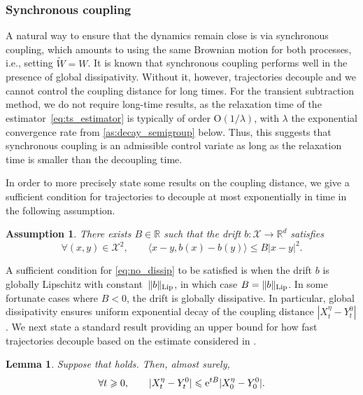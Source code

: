 \documentclass[11pt]{article}
\newcommand{\R}{\mathbb{R}}
\newcommand{\e}{\mathrm{e}}
\newcommand{\bigO}{\mathrm{O}}
\renewcommand{\geq}{\geqslant}
\renewcommand{\leq}{\leqslant}
\newtheorem{assumption}{Assumption}
\newtheorem{lemma}{Lemma}
\theoremstyle{definition}
\newcommand{\bLip}{\|b\|_{\rm Lip}}
\begin{document}
\subsubsection{Synchronous coupling}
\label{subsubsec:synchronous_coup}
A natural way to ensure that the dynamics remain close is via synchronous coupling, which amounts to using the same Brownian motion for both processes, i.e., setting $\widetilde{W} = W$. It is known that synchronous coupling performs well in the presence of global dissipativity. Without it, however, trajectories decouple and we cannot control the coupling distance for long times. For the transient subtraction method, we do not require long-time results, as the relaxation time of the estimator~\eqref{eq:ts_estimator} is typically of order $\bigO(1/\lambda)$, with $\lambda$ the exponential convergence rate from \cref{as:decay_semigroup} below. Thus, this suggests that synchronous coupling is an admissible control variate as long as the relaxation time is smaller than the decoupling time.

In order to more precisely state some results on the coupling distance, we give a sufficient condition for trajectories to decouple at most exponentially in time in the following assumption.

\begin{assumption}
\label{as:contractivity}
	There exists $B\in\R$ such that the drift $b\colon \mathcal{X} \to \R^d$ satisfies
\begin{equation}
		\forall (x,y) \in \mathcal{X}^2, \qquad \langle x-y, b(x)-b(y)\rangle \leq B|x-y|^2.
		\label{eq:no_dissip}
	\end{equation}
\end{assumption}

A sufficient condition for \eqref{eq:no_dissip} to be satisfied is when the drift $b$ is globally Lipschitz with constant~$\bLip$, in which case $B = \bLip$. In some fortunate cases where $B<0$, the drift is globally dissipative. In particular, global dissipativity ensures uniform exponential decay of the coupling distance $|X_t^\eta - Y_t^0|$.  We next state a standard result providing an upper bound for how fast trajectories decouple based on the estimate considered in .

\begin{lemma}
	\label{lemma:decoupling_times}
	Suppose that  holds. Then, almost surely,
\begin{equation}
\notag
\forall t\geq 0, \qquad |X_t^\eta - Y_t^0| \leq \e^{tB}|X_0^\eta - Y_0^0|.
	\label{eq:gronwall_decouple}
	\end{equation}
\end{lemma}
\end{document}
